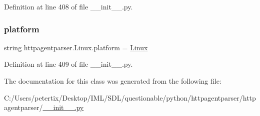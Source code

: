 Definition at line 408 of file \+\_\+\+\_\+init\+\_\+\+\_\+.\+py.

\hypertarget{classhttpagentparser_1_1_linux_a0f50a845c2d886f1c31c31f03571d293}{}\label{classhttpagentparser_1_1_linux_a0f50a845c2d886f1c31c31f03571d293} 
\subsubsection{\texorpdfstring{platform}{platform}}
{\footnotesize\ttfamily string httpagentparser.\+Linux.\+platform = \textquotesingle{}\hyperlink{classhttpagentparser_1_1_linux}{Linux}\textquotesingle{}\hspace{0.3cm}{\ttfamily [static]}}



Definition at line 409 of file \+\_\+\+\_\+init\+\_\+\+\_\+.\+py.



The documentation for this class was generated from the following file\+:\begin{DoxyCompactItemize}
\item 
C\+:/\+Users/petertix/\+Desktop/\+I\+M\+L/\+S\+D\+L/questionable/python/httpagentparser/httpagentparser/\hyperlink{____init_____8py}{\+\_\+\+\_\+init\+\_\+\+\_\+.\+py}\end{DoxyCompactItemize}
